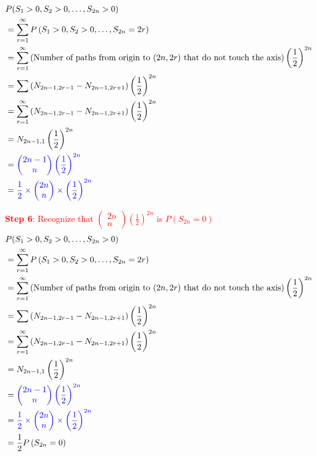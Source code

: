 \begin{align*}
  &P(S_1 > 0, S_2 > 0, \hdots, S_{2n} > 0) \\
  &= \sum_{r = 1}^{\infty} P \left( S_1 > 0, S_2 > 0, \hdots, S_{2n} = 2r \right) \\
  &= \sum_{r = 1}^{\infty} \left( \text{Number of paths from origin to $(2n, 2r)$ that do not touch the axis} \right)  \left( \frac{1}{2} \right)^{2n} \\
  &= \sum \left( N_{2n-1, 2r-1} - N_{2n -1, 2r + 1} \right)  \left( \frac{1}{2} \right)^{2n} \\
  &= \sum_{r =1}^{\infty} \left( N_{2n-1, 2r-1} - N_{2n -1, 2r + 1} \right)  \left( \frac{1}{2} \right)^{2n}
   \\
  &= N_{2n -1, 1} \left( \frac{1}{2} \right)^{2n} \\
  &= \textcolor{blue}{ \begin{pmatrix} 2n - 1\\ n \end{pmatrix} \left( \frac{1}{2} \right)^{2n} } \\
  &= \textcolor{blue}{ \frac{1}{2} \times \begin{pmatrix} 2n \\ n \end{pmatrix}  \times  \left( \frac{1}{2} \right)^{2n} }
\end{align*}

\textcolor{red}{\textbf{Step 6}: Recognize that $ \begin{pmatrix} 2n \\ n \end{pmatrix} \left( \frac{1}{2} \right)^{2n} $ is $P(S_{2n} = 0)$}
\begin{align*}
  &P(S_1 > 0, S_2 > 0, \hdots, S_{2n} > 0) \\
  &= \sum_{r = 1}^{\infty} P \left( S_1 > 0, S_2 > 0, \hdots, S_{2n} = 2r \right) \\
  &= \sum_{r = 1}^{\infty} \left( \text{Number of paths from origin to $(2n, 2r)$ that do not touch the axis} \right)  \left( \frac{1}{2} \right)^{2n} \\
  &= \sum \left( N_{2n-1, 2r-1} - N_{2n -1, 2r + 1} \right)  \left( \frac{1}{2} \right)^{2n} \\
  &= \sum_{r =1}^{\infty} \left( N_{2n-1, 2r-1} - N_{2n -1, 2r + 1} \right)  \left( \frac{1}{2} \right)^{2n}
   \\
  &= N_{2n -1, 1} \left( \frac{1}{2} \right)^{2n} \\
  &= \textcolor{blue}{ \begin{pmatrix} 2n - 1\\ n \end{pmatrix} \left( \frac{1}{2} \right)^{2n} } \\
  &= \textcolor{blue}{ \frac{1}{2} \times \begin{pmatrix} 2n \\ n \end{pmatrix}  \times  \left( \frac{1}{2} \right)^{2n} } \\
  &= \frac{1}{2} P \left( S_{2n} = 0 \right) 
\end{align*}

